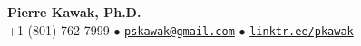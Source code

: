 \documentclass[letterpaper,12pt]{article}
\def\name{Pierre Kawak, Ph.D.}
\begin{document}


\begin{center}
  {\LARGE \textbf{Pierre Kawak, Ph.D.} }\\[1ex]
  +1 (801) 762-7999 $\bullet$ \href{mailto:pskawak@gmail.com}{\tt pskawak@gmail.com} $\bullet$ \href{https://linktr.ee/pkawak}{\tt linktr.ee/pkawak}\\
\end{center}
\end{document}
